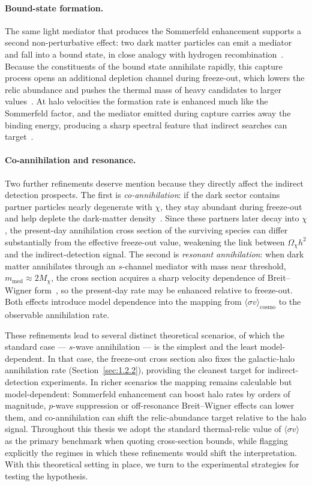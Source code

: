 \paragraph{Bound-state formation.}
The same light mediator that produces the Sommerfeld enhancement supports a second non-perturbative effect: two dark matter particles can emit a mediator and fall into a bound state, in close analogy with hydrogen recombination~\cite{vonHarling:2014kha}.
Because the constituents of the bound state annihilate rapidly, this capture process opens an additional depletion channel during freeze-out, which lowers the relic abundance and pushes the thermal mass of heavy candidates to larger values~\cite{Mitridate:2017izz}.
At halo velocities the formation rate is enhanced much like the Sommerfeld factor, and the mediator emitted during capture carries away the binding energy, producing a sharp spectral feature that indirect searches can target~\cite{Baldes:2020hwx}.

\paragraph{Co-annihilation and resonance.}
Two further refinements deserve mention because they directly affect the indirect detection prospects.
The first is \emph{co-annihilation}: if the dark sector contains partner particles nearly degenerate with $\chi$, they stay abundant during freeze-out and help deplete the dark-matter density~\cite{Ellis:1983ew,Griest:1990kh}.
Since these partners later decay into $\chi$, the present-day annihilation cross section of the surviving species can differ substantially from the effective freeze-out value, weakening the link between $\Omega_\chi h^2$ and the indirect-detection signal.
The second is \emph{resonant annihilation}: when dark matter annihilates through an $s$-channel mediator with mass near threshold, $m_\mathrm{med}\approx 2 M_\chi$, the cross section acquires a sharp velocity dependence of Breit--Wigner form~\cite{Griest:1990kh,Gondolo:1990dk}, so the present-day rate may be enhanced relative to freeze-out.
Both effects introduce model dependence into the mapping from $\langle\sigma v\rangle_\mathrm{cosmo}$ to the observable annihilation rate.

These refinements lead to several distinct theoretical scenarios, of which the standard case --- $s$-wave annihilation --- is the simplest and the least model-dependent.
In that case, the freeze-out cross section also fixes the galactic-halo annihilation rate (Section~\ref{sec:1.2.2}), providing the cleanest target for indirect-detection experiments.
In richer scenarios the mapping remains calculable but model-dependent: Sommerfeld enhancement can boost halo rates by orders of magnitude, $p$-wave suppression or off-resonance Breit--Wigner effects can lower them, and co-annihilation can shift the relic-abundance target relative to the halo signal.
Throughout this thesis we adopt the standard thermal-relic value of $\langle\sigma v\rangle$ as the primary benchmark when quoting cross-section bounds, while flagging explicitly the regimes in which these refinements would shift the interpretation.
With this theoretical setting in place, we turn to the experimental strategies for testing the \WIMP hypothesis.
